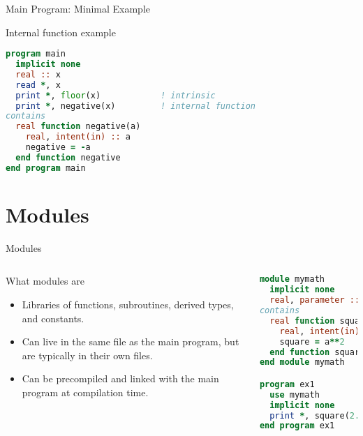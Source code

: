 \begin{frame}[fragile]{Main Program: Minimal Example}
\begin{block}{Internal function example}
\begin{lstlisting}[language=Fortran]
program main
  implicit none
  real :: x
  read *, x
  print *, floor(x)            ! intrinsic
  print *, negative(x)         ! internal function
contains
  real function negative(a)
    real, intent(in) :: a
    negative = -a
  end function negative
end program main
\end{lstlisting}
\end{block}
\end{frame}


\section{Modules}

\begin{frame}[fragile]{Modules}
  \begin{columns}[T]
    \begin{block}{What modules are}
      \begin{itemize}
        \item Libraries of functions, subroutines, derived types, and constants.
        \item Can live in the same file as the main program, but are typically in their own files.
        \item Can be precompiled and linked with the main program at compilation time.
      \end{itemize}
    \end{block}
    \vspace{0.3em}

\begin{lstlisting}[language=Fortran]
module mymath
  implicit none
  real, parameter :: pi = 3.14
contains
  real function square(a)
    real, intent(in) :: a
    square = a**2
  end function square
end module mymath

program ex1
  use mymath
  implicit none
  print *, square(2.3), pi
end program ex1
\end{lstlisting}
    \end{columns}
\end{frame}


